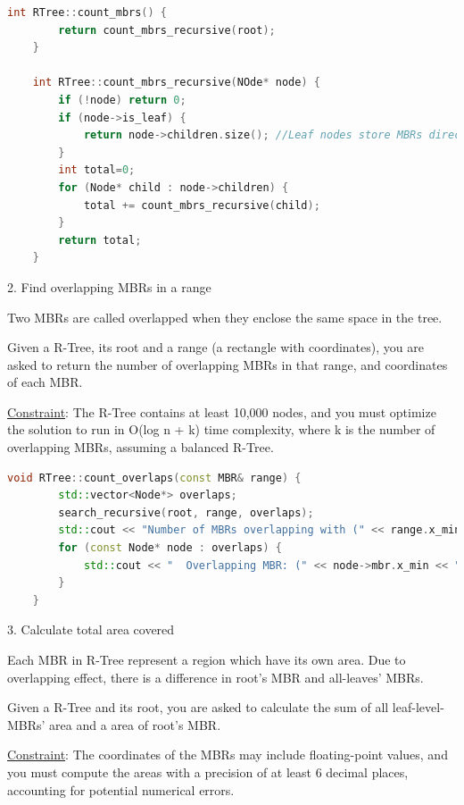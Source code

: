 \documentclass{article}
\begin{document}
\begin{lstlisting}[language=c++]
	int RTree::count_mbrs() {
		return count_mbrs_recursive(root);
	}

	int RTree::count_mbrs_recursive(NOde* node) {
		if (!node) return 0;
		if (node->is_leaf) {
			return node->children.size(); //Leaf nodes store MBRs directly
		}
		int total=0;
		for (Node* child : node->children) {
			total += count_mbrs_recursive(child);
		}
		return total;
	}
\end{lstlisting}

\begin{question}{2. Find overlapping MBRs in a range}
	
	\quad Two MBRs are called overlapped when they enclose the same space in the tree.
	
	\quad Given a R-Tree, its root and a range (a rectangle with coordinates), you are asked to return the number of overlapping MBRs in that range, and coordinates of each MBR. 
	
	\quad \underline{Constraint}: The R-Tree contains at least 10,000 nodes, and you must optimize the solution to run in O(log n + k) time complexity, where k is the number of overlapping MBRs, assuming a balanced R-Tree.
\end{question}

\begin{lstlisting}[language=c++]
	void RTree::count_overlaps(const MBR& range) {
		std::vector<Node*> overlaps;
		search_recursive(root, range, overlaps);
		std::cout << "Number of MBRs overlapping with (" << range.x_min << ", " << range.y_min << ", " << range.x_max << ", " << range.y_max << "): " << overlaps.size() << std::endl;
		for (const Node* node : overlaps) {
			std::cout << "  Overlapping MBR: (" << node->mbr.x_min << ", " << node->mbr.y_min << ", " << node->mbr.x_max << ", " << node->mbr.y_max << ")\n";
		}
	}
\end{lstlisting}

\begin{question}{3. Calculate total area covered}
	
	\quad Each MBR in R-Tree represent a region which have its own area. Due to overlapping effect, there is a difference in root's MBR and all-leaves' MBRs.

	\quad Given a R-Tree and its root, you are asked to calculate the sum of all leaf-level-MBRs' area and a area of root's MBR.

	\quad \underline{Constraint}: The coordinates of the MBRs may include floating-point values, and you must compute the areas with a precision of at least 6 decimal places, accounting for potential numerical errors.
\end{question}
\end{document}
